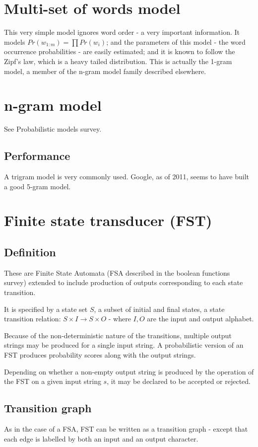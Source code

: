 \documentclass[oneside, article]{memoir}
\begin{document}
\section{Multi-set of words model}
This very simple model ignores word order - a very important information. It models $Pr(w_{1:m}) = \prod Pr(w_i)$; and the parameters of this model - the word occurrence probabilities - are easily estimated; and it is known to follow the Zipf's law, which is a heavy tailed distribution. This is actually the 1-gram model, a member of the n-gram model family described elsewhere.

\section{n-gram model}
See Probabilistic models survey.

\subsection{Performance}
A trigram model is very commonly used. Google, as of 2011, seems to have built a good 5-gram model.

\section{Finite state transducer (FST)}
\subsection{Definition}
These are Finite State Automata (FSA described in the boolean functions survey) extended to include production of outputs corresponding to each state transition.

It is specified by a state set $S$, a subset of initial and final states, a state transition relation: $S \times I \to S \times O$ - where $I, O$ are the input and output alphabet.

Because of the non-deterministic nature of the transitions, multiple output strings may be produced for a single input string. A probabilistic version of an FST produces probability scores along with the output strings.

Depending on whether a non-empty output string is produced by the operation of the FST on a given input string $s$, it may be declared to be accepted or rejected.

\subsection{Transition graph}
As in the case of a FSA, FST can be written as a transition graph - except that each edge is labelled by both an input and an output character.
\end{document}
